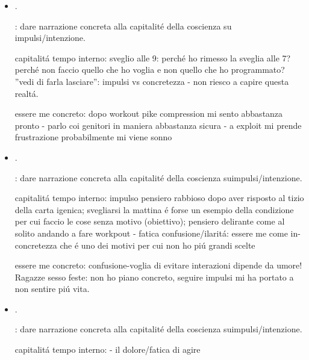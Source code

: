 \begin{itemize}
capitalit\'a tempo interno: la mattina sono in-cosciente come babbo: ''pensiero a levare'', non faccio niente - faccio il minimo indispensabile per soddisfazioni semplici - il tempo interno \'e occupato da ''impulsi''

essere me concreto: torcicollo mal dischiena sonnolenza confusione insopportabile al caldo seguendo shore e poi in biblioteca; non riesco a progettare oltre abitudini/impulsi

\item {}.

: dare narrazione concreta alla capitalit\'e della coscienza su impulsi/intenzione.

capitalit\'a tempo interno: sveglio alle 9: perch\'e ho rimesso la sveglia alle 7? perch\'e non faccio quello che ho voglia e non quello che ho programmato? ''vedi di farla lasciare'': impulsi vs concretezza - non riesco a capire questa realt\'a.

essere me concreto: dopo workout pike compression mi sento abbastanza pronto - parlo coi genitori in maniera abbastanza sicura - a exploit mi prende frustrazione probabilmente mi viene sonno

\item {}.

: dare narrazione concreta alla capitalit\'e della coscienza suimpulsi/intenzione.

capitalit\'a tempo interno: impulso pensiero rabbioso dopo aver risposto al tizio della carta igenica; svegliarsi la mattina \'e forse un esempio della condizione per cui faccio le cose senza motivo (obiettivo); pensiero delirante come al solito andando a fare workpout - fatica confusione/ilarit\'a: essere me come in-concretezza che \'e uno dei motivi per cui non ho pi\'u grandi scelte

essere me concreto: confusione-voglia di evitare interazioni dipende da umore! Ragazze sesso feste: non ho piano concreto, seguire impulsi mi ha portato a non sentire pi\'u vita.

\item {}.

: dare narrazione concreta alla capitalit\'e della coscienza suimpulsi/intenzione.

capitalit\'a tempo interno:  - il dolore/fatica di agire


\end{itemize}
